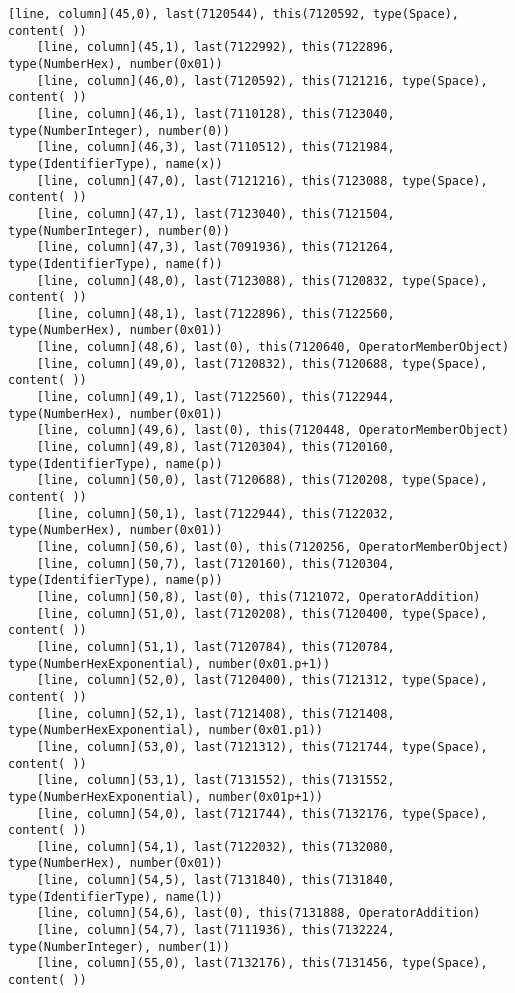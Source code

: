 \documentclass[UTF8]{ctexart}
\begin{document}
{\begin{lstlisting}[language={[ANSI]C++}]
    [line, column](45,0), last(7120544), this(7120592, type(Space), content( ))
    [line, column](45,1), last(7122992), this(7122896, type(NumberHex), number(0x01))
    [line, column](46,0), last(7120592), this(7121216, type(Space), content( ))
    [line, column](46,1), last(7110128), this(7123040, type(NumberInteger), number(0))
    [line, column](46,3), last(7110512), this(7121984, type(IdentifierType), name(x))
    [line, column](47,0), last(7121216), this(7123088, type(Space), content( ))
    [line, column](47,1), last(7123040), this(7121504, type(NumberInteger), number(0))
    [line, column](47,3), last(7091936), this(7121264, type(IdentifierType), name(f))
    [line, column](48,0), last(7123088), this(7120832, type(Space), content( ))
    [line, column](48,1), last(7122896), this(7122560, type(NumberHex), number(0x01))
    [line, column](48,6), last(0), this(7120640, OperatorMemberObject)
    [line, column](49,0), last(7120832), this(7120688, type(Space), content( ))
    [line, column](49,1), last(7122560), this(7122944, type(NumberHex), number(0x01))
    [line, column](49,6), last(0), this(7120448, OperatorMemberObject)
    [line, column](49,8), last(7120304), this(7120160, type(IdentifierType), name(p))
    [line, column](50,0), last(7120688), this(7120208, type(Space), content( ))
    [line, column](50,1), last(7122944), this(7122032, type(NumberHex), number(0x01))
    [line, column](50,6), last(0), this(7120256, OperatorMemberObject)
    [line, column](50,7), last(7120160), this(7120304, type(IdentifierType), name(p))
    [line, column](50,8), last(0), this(7121072, OperatorAddition)
    [line, column](51,0), last(7120208), this(7120400, type(Space), content( ))
    [line, column](51,1), last(7120784), this(7120784, type(NumberHexExponential), number(0x01.p+1))
    [line, column](52,0), last(7120400), this(7121312, type(Space), content( ))
    [line, column](52,1), last(7121408), this(7121408, type(NumberHexExponential), number(0x01.p1))
    [line, column](53,0), last(7121312), this(7121744, type(Space), content( ))
    [line, column](53,1), last(7131552), this(7131552, type(NumberHexExponential), number(0x01p+1))
    [line, column](54,0), last(7121744), this(7132176, type(Space), content( ))
    [line, column](54,1), last(7122032), this(7132080, type(NumberHex), number(0x01))
    [line, column](54,5), last(7131840), this(7131840, type(IdentifierType), name(l))
    [line, column](54,6), last(0), this(7131888, OperatorAddition)
    [line, column](54,7), last(7111936), this(7132224, type(NumberInteger), number(1))
    [line, column](55,0), last(7132176), this(7131456, type(Space), content( ))

\end{lstlisting}}
\end{document}

